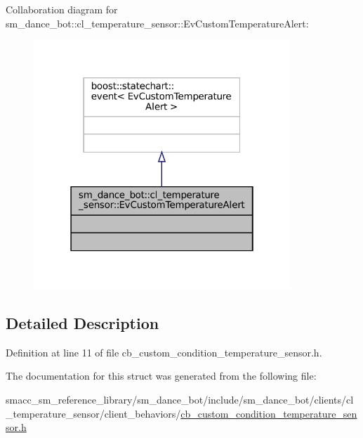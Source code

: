 Collaboration diagram for sm\+\_\+dance\+\_\+bot\+:\+:cl\+\_\+temperature\+\_\+sensor\+:\+:Ev\+Custom\+Temperature\+Alert\+:
\nopagebreak
\begin{figure}[H]
\begin{center}
\leavevmode
\includegraphics[width=274pt]{structsm__dance__bot_1_1cl__temperature__sensor_1_1EvCustomTemperatureAlert__coll__graph}
\end{center}
\end{figure}


\subsection{Detailed Description}


Definition at line 11 of file cb\+\_\+custom\+\_\+condition\+\_\+temperature\+\_\+sensor.\+h.



The documentation for this struct was generated from the following file\+:\begin{DoxyCompactItemize}
\item 
smacc\+\_\+sm\+\_\+reference\+\_\+library/sm\+\_\+dance\+\_\+bot/include/sm\+\_\+dance\+\_\+bot/clients/cl\+\_\+temperature\+\_\+sensor/client\+\_\+behaviors/\hyperlink{sm__dance__bot_2include_2sm__dance__bot_2clients_2cl__temperature__sensor_2client__behaviors_2cb15a3861006d3511ad9c098b2b40e8300}{cb\+\_\+custom\+\_\+condition\+\_\+temperature\+\_\+sensor.\+h}\end{DoxyCompactItemize}
